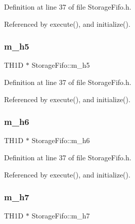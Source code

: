 Definition at line 37 of file Storage\+Fifo.\+h.



Referenced by execute(), and initialize().

\mbox{\label{classStorageFifo_ae9133c5421f9fa166b837933706d2a59}} 
\subsubsection{\texorpdfstring{m\+\_\+h5}{m\_h5}}
{\footnotesize\ttfamily T\+H1D $\ast$ Storage\+Fifo\+::m\+\_\+h5\hspace{0.3cm}{\ttfamily [private]}}



Definition at line 37 of file Storage\+Fifo.\+h.



Referenced by execute(), and initialize().

\mbox{\label{classStorageFifo_a39ca376b2a74643c54e4df2dfabf0906}} 
\subsubsection{\texorpdfstring{m\+\_\+h6}{m\_h6}}
{\footnotesize\ttfamily T\+H1D $\ast$ Storage\+Fifo\+::m\+\_\+h6\hspace{0.3cm}{\ttfamily [private]}}



Definition at line 37 of file Storage\+Fifo.\+h.



Referenced by execute(), and initialize().

\mbox{\label{classStorageFifo_a01784ff4138a1b32eb517931b5866cc6}} 
\subsubsection{\texorpdfstring{m\+\_\+h7}{m\_h7}}
{\footnotesize\ttfamily T\+H1D $\ast$ Storage\+Fifo\+::m\+\_\+h7\hspace{0.3cm}{\ttfamily [private]}}



